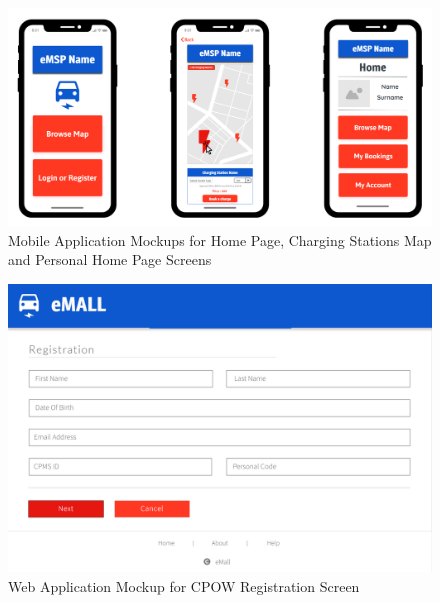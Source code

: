 \documentclass[a4paper]{report}
\begin{document}
\begin{figure}[hp]
\centering
\includegraphics[scale=0.45]{img/mockups/MCKP2.png}
\caption{Mobile Application Mockups for Home Page, Charging Stations Map and Personal Home Page Screens}
\label{fig:MobileApp-activity}
\end{figure}

\begin{figure}[hp]
\centering
\includegraphics[scale=0.6]{img/mockups/MCKP_CPOWRegistration.png}
\caption{Web Application Mockup for CPOW Registration Screen}
\label{fig:MobileApp-activity}
\end{figure}
\end{document}

